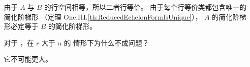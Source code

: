 \begin{answer}
\begin{exparts}


          由于 \( A \) 与 \( B \) 的行空间相等，所以二者行等价。
          由于每个行等价类都包含唯一的简化阶梯形
          （定理 One.III.\ref{th:ReducedEchelonFormIsUnique}），
          \( A \) 的简化阶梯形必定等于 \( B \) 的简化阶梯形。
      \end{exparts}
    \end{answer}
  \item
    对于 ，在 \( r \) 大于 \( n \) 的
    情形下为什么不成问题？
    \begin{answer}
      它不可能更大。
    \end{answer}
  \item
